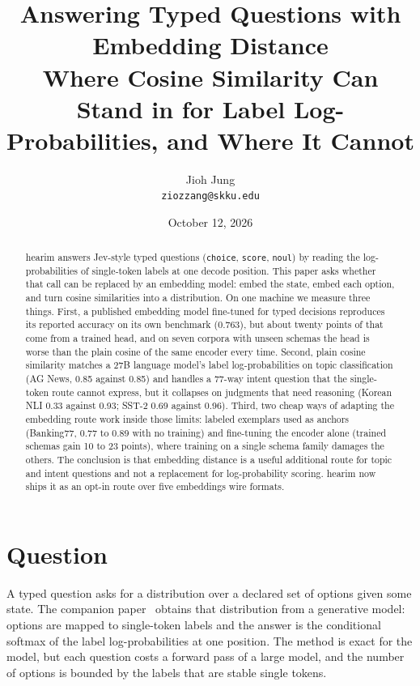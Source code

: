 \documentclass[11pt]{article}
\title{Answering Typed Questions with Embedding Distance\\
\large Where Cosine Similarity Can Stand in for Label Log-Probabilities, and Where It Cannot}
\author{Jioh Jung\\ \texttt{ziozzang@skku.edu}}
\date{October 12, 2026}
\begin{document}
\maketitle

\begin{abstract}
hearim answers Jev-style typed questions (\texttt{choice}, \texttt{score},
\texttt{noul}) by reading the log-probabilities of single-token labels at one
decode position. This paper asks whether that call can be replaced by an
embedding model: embed the state, embed each option, and turn cosine
similarities into a distribution. On one machine we measure three things.
First, a published embedding model fine-tuned for typed decisions reproduces
its reported accuracy on its own benchmark (0.763), but about twenty points of
that come from a trained head, and on seven corpora with unseen schemas the
head is worse than the plain cosine of the same encoder every time. Second,
plain cosine similarity matches a 27B language model's label log-probabilities
on topic classification (AG News, 0.85 against 0.85) and handles a 77-way
intent question that the single-token route cannot express, but it collapses
on judgments that need reasoning (Korean NLI 0.33 against 0.93; SST-2 0.69
against 0.96). Third, two cheap ways of adapting the embedding route work
inside those limits: labeled exemplars used as anchors (Banking77, 0.77 to
0.89 with no training) and fine-tuning the encoder alone (trained schemas
gain 10 to 23 points), where training on a single schema family damages the
others. The conclusion is that embedding distance is a useful additional
route for topic and intent questions and not a replacement for log-probability
scoring. hearim now ships it as an opt-in route over five embeddings wire
formats.
\end{abstract}

\section{Question}

A typed question asks for a distribution over a declared set of options given
some state. The companion paper~\cite{hearim} obtains that distribution from a
generative model: options are mapped to single-token labels and the answer is
the conditional softmax of the label log-probabilities at one position. The
method is exact for the model, but each question costs a forward pass of a
large model, and the number of options is bounded by the labels that are
stable single tokens.
\end{document}
